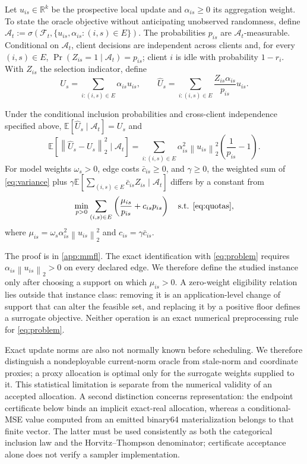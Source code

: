 \documentclass[smallextended,envcountsect]{svjour3}
\newcommand{\R}{\mathbb{R}}
\newcommand{\cA}{\mathcal{A}}
\newcommand{\E}{\mathbb{E}}
\newcommand{\cF}{\mathcal{F}}
\newcommand{\norm}[1]{\left\lVert#1\right\rVert}
\begin{document}
Let $u_{is}\in\R^k$ be the prospective local update and
$\alpha_{is}\ge0$ its aggregation weight.  To state the oracle objective
without anticipating unobserved randomness, define
$\cA_t:=\sigma(\cF_t,\{u_{is},\alpha_{is}:(i,s)\in E\})$.  The probabilities
$p_{is}$ are $\cA_t$-measurable.  Conditional on $\cA_t$, client decisions are
independent across clients and, for every $(i,s)\in E$,
$\Pr(Z_{is}=1\mid\cA_t)=p_{is}$; client $i$ is idle with probability $1-r_i$.
With $Z_{is}$ the selection indicator, define
\begin{equation}
 U_s=\sum_{i:(i,s)\in E}\alpha_{is}u_{is},\qquad
 \widehat U_s=\sum_{i:(i,s)\in E}
 \frac{Z_{is}\alpha_{is}}{p_{is}}u_{is}.
 \label{eq:ht}
\end{equation}

\begin{theorem}
\label{thm:mmfl}
Under the conditional inclusion probabilities and cross-client independence
specified above,
$\E[\widehat U_s\mid\cA_t]=U_s$ and
\begin{equation}
 \E\!\left[\norm{\widehat U_s-U_s}_2^2\mid\cA_t\right]
 =\sum_{i:(i,s)\in E}\alpha_{is}^2\norm{u_{is}}_2^2
 \left(\frac1{p_{is}}-1\right).
 \label{eq:variance}
\end{equation}
For model weights $\omega_s>0$, edge costs $\bar c_{is}\ge0$, and
$\gamma\ge0$, the weighted
sum of \cref{eq:variance} plus
$\gamma\E[\sum_{(i,s)\in E}\bar c_{is}Z_{is}\mid\cA_t]$ differs by a constant from
\begin{equation}
 \min_{p>0}\sum_{(i,s)\in E}
 \left(\frac{\mu_{is}}{p_{is}}+c_{is}p_{is}\right)
 \quad\text{s.t. \cref{eq:quotas}},
 \label{eq:mmfl-transport}
\end{equation}
where $\mu_{is}=\omega_s\alpha_{is}^2\norm{u_{is}}_2^2$ and
$c_{is}=\gamma\bar c_{is}$.
\end{theorem}

The proof is in \cref{app:mmfl}.  The exact identification with
\cref{eq:problem} requires
$\alpha_{is}\norm{u_{is}}_2>0$ on every declared edge.  We therefore define the
studied instance only after choosing a support on which $\mu_{is}>0$.  A
zero-weight eligibility relation lies outside that instance class: removing it
is an application-level change of support that can alter the feasible set, and
replacing it by a positive floor defines a surrogate objective.  Neither
operation is an exact numerical preprocessing rule for \cref{eq:problem}.

Exact update norms are also not normally known before scheduling.  We therefore
distinguish a nondeployable current-norm oracle from stale-norm and coordinate
proxies; a proxy allocation is optimal only for the surrogate weights supplied
to it.  This statistical limitation is separate from the numerical validity of
an accepted allocation.  A second distinction concerns representation: the
endpoint certificate below binds an implicit exact-real allocation, whereas a
conditional-MSE value computed from an emitted binary64 materialization belongs
to that finite vector.  The latter must be used consistently as both the
categorical inclusion law and the Horvitz--Thompson denominator; certificate
acceptance alone does not verify a sampler implementation.
\end{document}
